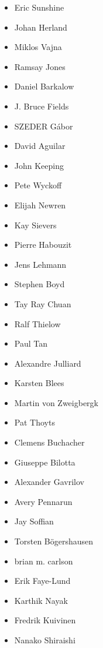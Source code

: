 \begin{frame}
{\begin{multicols}{7}
\begin{itemize}
                \item[] Eric Sunshine
                \item[] Johan Herland
                \item[] Miklos Vajna
                \item[] Ramsay Jones
                \item[] Daniel Barkalow
                \item[] J. Bruce Fields
                \item[] SZEDER Gábor
                \item[] David Aguilar
                \item[] John Keeping
                \item[] Pete Wyckoff
                \item[] Elijah Newren
                \item[] Kay Sievers
                \item[] Pierre Habouzit
                \item[] Jens Lehmann
                \item[] Stephen Boyd
                \item[] Tay Ray Chuan
                \item[] Ralf Thielow
                \item[] Paul Tan
                \item[] Alexandre Julliard
                \item[] Karsten Blees
                \item[] Martin von Zweigbergk
                \item[] Pat Thoyts
                \item[] Clemens Buchacher
                \item[] Giuseppe Bilotta
                \item[] Alexander Gavrilov
                \item[] Avery Pennarun
                \item[] Jay Soffian
                \item[] Torsten Bögershausen
                \item[] brian m. carlson
                \item[] Erik Faye-Lund
                \item[] Karthik Nayak
                \item[] Fredrik Kuivinen
                \item[] Nanako Shiraishi

\end{itemize}
\end{multicols}}
\end{frame}
